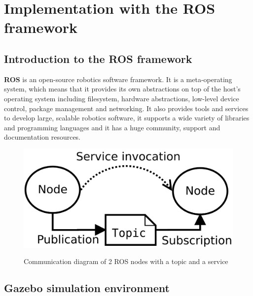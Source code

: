 \section{Implementation with the ROS framework}

\subsection{Introduction to the ROS framework}

\textbf{ROS} is an open-source robotics software framework. It is a meta-operating system, which means that it provides its own 
abstractions on top of the host's operating system including filesystem, hardware abstractions, low-level device control, 
package management and networking. It also provides tools and services to develop large, scalable 
robotics software, it supports a wide variety of libraries and programming languages and it has a huge community, support and 
documentation resources.

\begin{center}
\begin{figure}[H]
\centering
\includegraphics{images/ROS_basic_concepts_topics_nodes.png}\\
\caption{Communication diagram of 2 ROS nodes with a topic and a service}
\end{figure}
\end{center}


\subsection{Gazebo simulation environment}

